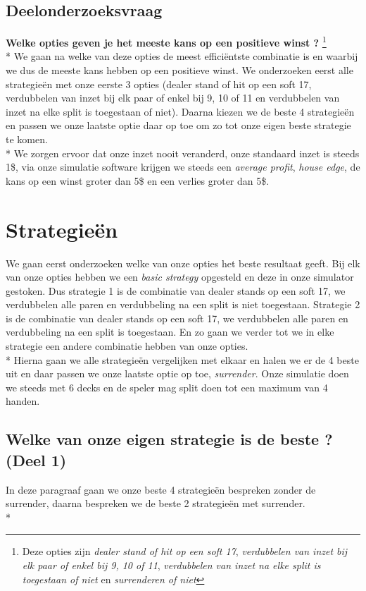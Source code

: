 \documentclass[conference]{IEEEtran}
\begin{document}
\subsection{Deelonderzoeksvraag} 
\textbf{Welke opties geven je het meeste kans op een positieve winst ?} 
\footnote{ Deze opties zijn {\it dealer stand of hit op een soft 17}, {\it verdubbelen van inzet bij elk paar of enkel bij 9, 10 of 11},
    {\it verdubbelen van inzet na elke split is toegestaan of niet} en {\it surrenderen of niet}}\\*
We gaan na welke van deze opties de meest effici\"entste combinatie is en waarbij we dus de meeste kans hebben op een positieve winst.
We onderzoeken eerst alle strategie\"en met onze eerste 3 opties (dealer stand of hit op een soft 17, verdubbelen van inzet bij elk paar of enkel bij 9, 10 of 11 en verdubbelen van inzet na elke split is toegestaan of niet). Daarna kiezen we de beste 4 strategie\"en en passen we onze laatste optie daar op toe om zo tot onze eigen beste strategie te komen. \\*
We zorgen ervoor dat onze inzet nooit veranderd, onze standaard inzet is steeds 1\$, via onze simulatie software krijgen we steeds een \textit{average profit}, \textit{house edge}, de kans op een winst groter dan 5\$ en een verlies groter dan 5\$. 

\newpage

\section{Strategie\"en}
We gaan eerst onderzoeken welke van onze opties het beste resultaat geeft. Bij elk van onze opties hebben we een \textit{basic strategy}
opgesteld en deze in onze simulator gestoken. Dus strategie 1 is de combinatie van dealer stands op een soft 17, we verdubbelen alle paren en
verdubbeling na een split is niet toegestaan. Strategie 2 is de combinatie van dealer stands op een soft 17, we verdubbelen alle paren en
verdubbeling na een split is toegestaan. En zo gaan we verder tot we in elke strategie een andere combinatie hebben van onze opties.\\*
Hierna gaan we alle strategie\"en vergelijken met elkaar en halen we er de 4 beste uit en daar passen we onze laatste optie op toe, \textit{surrender}. Onze simulatie doen we steeds met 6 decks en de speler mag split doen tot een maximum van 4 handen.

\subsection{Welke van onze eigen strategie is de beste ? (Deel 1)}
In deze paragraaf gaan we onze beste 4 strategie\"en bespreken zonder de surrender, daarna bespreken we de beste 2 strategie\"en met surrender.\\*
\end{document}

